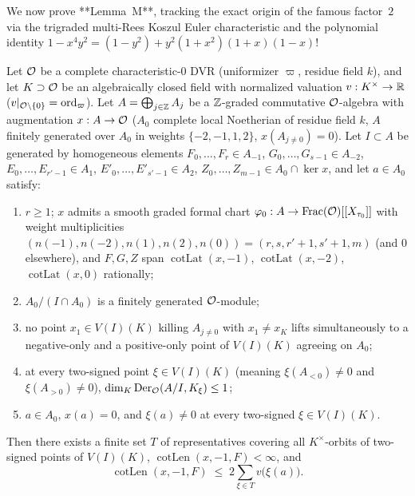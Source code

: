 We now prove **Lemma~M**, tracking the exact origin of the famous factor~$2$ via the trigraded multi-Rees Koszul Euler characteristic and the polynomial identity $1 - x^4 y^2 = (1 - y^2) + y^2(1 + x^2)(1 + x)(1 - x)$!

\begin{theorem}
\label{thm:20:lemma-m}
Let $\mathcal{O}$ be a complete characteristic-$0$ DVR (uniformizer $\varpi$, residue field $k$), and let $K \supset \mathcal{O}$ be an algebraically closed field with normalized valuation $v : K^\times \to \mathbb{R}$ ($v|_{\mathcal{O}\setminus\{0\}} = \operatorname{ord}_\varpi$). Let $A = \bigoplus_{j \in \mathbb{Z}} A_j$ be a $\mathbb{Z}$-graded commutative $\mathcal{O}$-algebra with augmentation $x : A \to \mathcal{O}$ ($A_0$ complete local Noetherian of residue field $k$, $A$ finitely generated over $A_0$ in weights $\{-2, -1, 1, 2\}$, $x(A_{j \neq 0}) = 0$). Let $I \subset A$ be generated by homogeneous elements $F_0, \dots, F_r \in A_{-1}$, $G_0, \dots, G_{s-1} \in A_{-2}$, $E_0, \dots, E_{r'-1} \in A_1$, $E'_0, \dots, E'_{s'-1} \in A_2$, $Z_0, \dots, Z_{m-1} \in A_0 \cap \ker x$, and let $a \in A_0$ satisfy:
\begin{enumerate}[label=\textup{(M\arabic*)}]
\item $r \ge 1$; $x$ admits a smooth graded formal chart $\varphi_0 : A \to \operatorname{Frac}(\mathcal{O})[[X_{\tau_0}]]$ with weight multiplicities $(n(-1), n(-2), n(1), n(2), n(0)) = (r, s, r'+1, s'+1, m)$ (and $0$ elsewhere), and $F, G, Z$ span $\operatorname{cotLat}(x, -1)$, $\operatorname{cotLat}(x, -2)$, $\operatorname{cotLat}(x, 0)$ rationally;
\item $A_0 / (I \cap A_0)$ is a finitely generated $\mathcal{O}$-module;
\item no point $x_1 \in V(I)(K)$ killing $A_{j \neq 0}$ with $x_1 \neq x_K$ lifts simultaneously to a negative-only and a positive-only point of $V(I)(K)$ agreeing on $A_0$;
\item at every two-signed point $\xi \in V(I)(K)$ (meaning $\xi(A_{<0}) \neq 0$ and $\xi(A_{>0}) \neq 0$), $\dim_K \operatorname{Der}_{\mathcal{O}}(A/I, K_\xi) \le 1$;
\item $a \in A_0$, $x(a) = 0$, and $\xi(a) \neq 0$ at every two-signed $\xi \in V(I)(K)$.
\end{enumerate}
Then there exists a finite set $T$ of representatives covering all $K^\times$-orbits of two-signed points of $V(I)(K)$, $\operatorname{cotLen}(x, -1, F) < \infty$, and
\begin{equation}
\label{eq:20:lemma-m}
  \operatorname{cotLen}(x, -1, F) \;\le\; 2 \sum_{\xi \in T} v\bigl(\xi(a)\bigr).
\end{equation}
\end{theorem}


